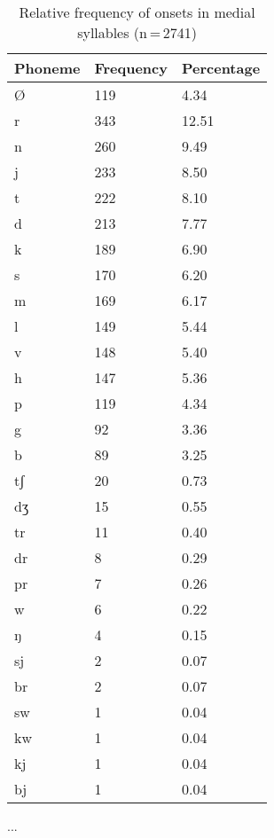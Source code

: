 \begin{table}[hp]\centering
\caption[Relative frequency of onsets in medial syllables]{Relative frequency of onsets in medial syllables (n\,=\,2741)}
\begin{tabu} to 0.5\textwidth{X X[c] X[c]}
\tableheaderfont\toprule
Phoneme
	& Frequency
	& Percentage
	\\
	
\toprule

Ø	&	119	&	4.34\pct\\

\midrule

r	&	343	&	12.51\pct\\
n	&	260	&	9.49\pct\\
j	&	233	&	8.50\pct\\
t	&	222	&	8.10\pct\\
d	&	213	&	7.77\pct\\
k	&	189	&	6.90\pct\\
s	&	170	&	6.20\pct\\
m	&	169	&	6.17\pct\\
l	&	149	&	5.44\pct\\
v	&	148	&	5.40\pct\\
h	&	147	&	5.36\pct\\
p	&	119	&	4.34\pct\\
g	&	92	&	3.36\pct\\
b	&	89	&	3.25\pct\\
tʃ	&	20	&	0.73\pct\\
dʒ	&	15	&	0.55\pct\\
tr	&	11	&	0.40\pct\\
dr	&	8	&	0.29\pct\\
pr	&	7	&	0.26\pct\\
w	&	6	&	0.22\pct\\
ŋ	&	4	&	0.15\pct\\
sj	&	2	&	0.07\pct\\
br	&	2	&	0.07\pct\\
sw	&	1	&	0.04\pct\\
kw	&	1	&	0.04\pct\\
kj	&	1	&	0.04\pct\\
bj	&	1	&	0.04\pct\\

\bottomrule
\end{tabu}
\label{tab:midon}
\end{table}

...

